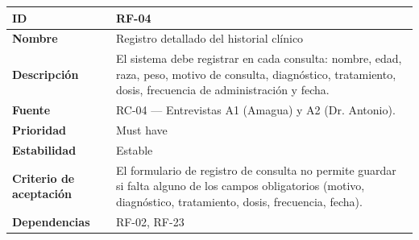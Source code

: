 \documentclass[
]{article}
\newcounter{none} %
\begin{document}
{\def\LTcaptype{none} %
\begin{longtable}[]{@{}
  >{\raggedright\arraybackslash}p{}
  >{\raggedright\arraybackslash}p{}@{}}
\toprule\noalign{}
\begin{minipage}[b]{\linewidth}\raggedright
\textbf{ID}
\end{minipage} & \begin{minipage}[b]{\linewidth}\raggedright
RF-04
\end{minipage} \\
\midrule\noalign{}
\endhead
\bottomrule\noalign{}
\endlastfoot
\textbf{Nombre} & \begin{minipage}[t]{\linewidth}\raggedright
Registro detallado del historial clínico
\end{minipage} \\
\textbf{Descripción} & \begin{minipage}[t]{\linewidth}\raggedright
El sistema debe registrar en cada consulta: nombre, edad, raza, peso,
motivo de consulta, diagnóstico, tratamiento, dosis, frecuencia de
administración y fecha.
\end{minipage} \\
\textbf{Fuente} & \begin{minipage}[t]{\linewidth}\raggedright
RC-04 --- Entrevistas A1 (Amagua) y A2 (Dr. Antonio).
\end{minipage} \\
\textbf{Prioridad} & \begin{minipage}[t]{\linewidth}\raggedright
Must have
\end{minipage} \\
\textbf{Estabilidad} & \begin{minipage}[t]{\linewidth}\raggedright
Estable
\end{minipage} \\
\textbf{Criterio de aceptación} &
\begin{minipage}[t]{\linewidth}\raggedright
El formulario de registro de consulta no permite guardar si falta alguno
de los campos obligatorios (motivo, diagnóstico, tratamiento, dosis,
frecuencia, fecha).
\end{minipage} \\
\textbf{Dependencias} & \begin{minipage}[t]{\linewidth}\raggedright
RF-02, RF-23
\end{minipage} \\
\end{longtable}
}
\end{document}
